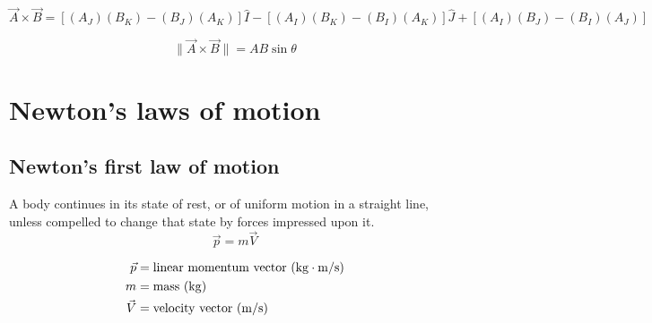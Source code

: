 \documentclass{article}
\begin{document}
	\begin{equation*}
	\boxed{\vec{A} \times \vec{B} = [(A_J)(B_K)-(B_J)(A_K)]\hat{I} - [(A_I)(B_K) - (B_I)(A_K)]\hat{J} + [(A_I)(B_J)-(B_I)(A_J)]}
	\end{equation*}
	
	\begin{equation*}
	\boxed{\lVert\vec{A} \times \vec{B}\rVert = AB\sin\theta}
	\end{equation*}

\section{Newton's laws of motion}
\subsection{Newton's first law of motion}
\begin{multicols}{2}
A body continues in its state of rest, or of uniform motion in a straight line, unless compelled to change that state by forces impressed upon it.
\vfill\null
\columnbreak
\begin{equation*}
	\boxed{\vec{p} = m\vec{V}}
\end{equation*}

\begin{align*}
\vec{p} &= \text{linear momentum vector (\si{\kilo\gram\meter\per\second})}\\
m &= \text{mass (\si{\kilo\gram})}\\
\vec{V} &= \text{velocity vector (\si{\meter\per\second})}\\
\end{align*}

\end{multicols}
\end{document}
